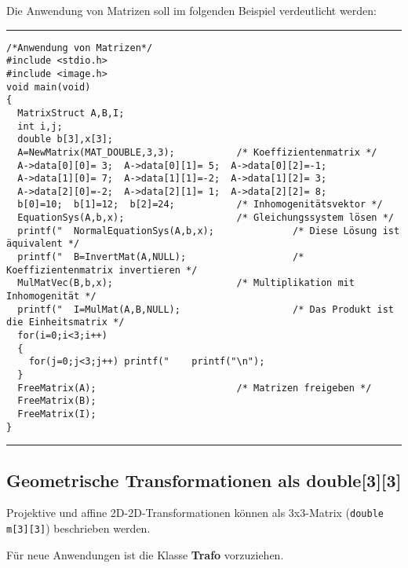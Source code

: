 \documentclass[10pt,titlepage]{article}
\def\bsee#1{#1}
\newcommand{\class}[1]{{\bf \bsee{#1}}}
\def\begprogr{\par\noindent\begin{minipage}{\textwidth}\medskip\hrule\medskip}
\def\endprogr{\nopagebreak\hrule\end{minipage}\par\medskip\noindent}
\begin{document}
{{Die Anwendung von Matrizen soll im folgenden Beispiel verdeutlicht werden:
\begprogr\begin{verbatim}
/*Anwendung von Matrizen*/
#include <stdio.h>
#include <image.h>
void main(void)
{
  MatrixStruct A,B,I;
  int i,j;
  double b[3],x[3];
  A=NewMatrix(MAT_DOUBLE,3,3);           /* Koeffizientenmatrix */
  A->data[0][0]= 3;  A->data[0][1]= 5;  A->data[0][2]=-1;
  A->data[1][0]= 7;  A->data[1][1]=-2;  A->data[1][2]= 3;
  A->data[2][0]=-2;  A->data[2][1]= 1;  A->data[2][2]= 8;
  b[0]=10;  b[1]=12;  b[2]=24;           /* Inhomogenitätsvektor */
  EquationSys(A,b,x);                    /* Gleichungssystem lösen */
  printf("  NormalEquationSys(A,b,x);              /* Diese Lösung ist äquivalent */
  printf("  B=InvertMat(A,NULL);                   /* Koeffizientenmatrix invertieren */
  MulMatVec(B,b,x);                      /* Multiplikation mit Inhomogenität */
  printf("  I=MulMat(A,B,NULL);                    /* Das Produkt ist die Einheitsmatrix */
  for(i=0;i<3;i++)
  { 
    for(j=0;j<3;j++) printf("    printf("\n");
  }
  FreeMatrix(A);                         /* Matrizen freigeben */
  FreeMatrix(B);
  FreeMatrix(I);
} 
\end{verbatim}\endprogr

\subsection{Geometrische Transformationen als double[3][3]}
Projektive und affine 2D-2D-Transformationen können als 3x3-Matrix
(\verb+double m[3][3]+) beschrieben werden.
 
Für neue Anwendungen ist die Klasse \class{Trafo} vorzuziehen.

}}
\end{document}
